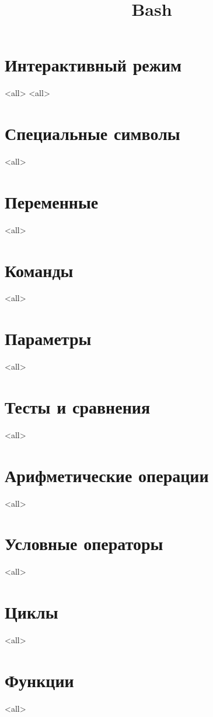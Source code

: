 


\title{Bash}



\begin{frame}
  \frametitle{}
  \titlepage
\end{frame}

\section{Интерактивный режим}
\mode<all>{}
\mode<all>{}
\section[symbols]{Специальные символы}
\mode<all>{}
\section[variables]{Переменные}
\mode<all>{}
\section[Commands]{Команды}
\mode<all>{}
\section{Параметры}
\mode<all>{}
\section{Тесты и сравнения}
\mode<all>{}
\section{Арифметические операции}
\mode<all>{}
\section{Условные операторы}
\mode<all>{}
\section{Циклы}
\mode<all>{}
\section{Функции}
\mode<all>{}



